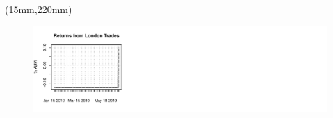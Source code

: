 \documentclass[nohyper,justified]{tufte-handout}\usepackage{graphicx, color}
\makeatletter
\def\maxwidth{ %
  \ifdim\Gin@nat@width>\linewidth
    \linewidth
  \else
    \Gin@nat@width
  \fi
}
\newenvironment{knitrout}{}{} %
\makeatother
\begin{document}
\begin{textblock*}{180mm}(15mm,220mm)
\begin{figure}
\vspace{0pt}

\begin{knitrout}
\color{fgcolor}
\includegraphics[width=\maxwidth]{figure/zonertns} 

\end{knitrout}

\end{figure}
\end{textblock*}
\end{document}
